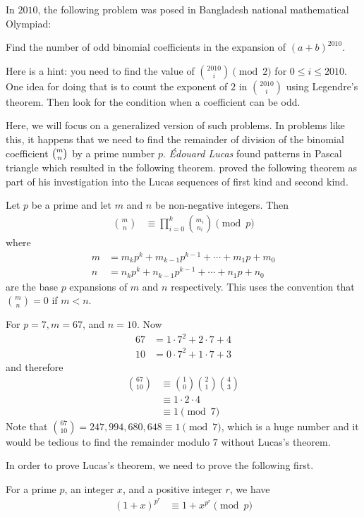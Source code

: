 In $2010$, the following problem was posed in Bangladesh national mathematical Olympiad:
\begin{problem}
	Find the number of odd binomial coefficients in the expansion of $(a+b)^{2010}$.
\end{problem}
Here is a hint: you need to find the value of $\binom{2010}{i}\pmod2$ for $0\leq i\leq2010$. One idea for doing that is to count the exponent of $2$ in $\binom{2010}{i}$ using Legendre's theorem. Then look for the condition when a coefficient can be odd.

Here, we will focus on a generalized version of such problems. In problems like this, it happens that we need to find the remainder of division of the binomial coefficient $\tbinom{m}{n}$ by a prime number $p$. \textit{\'{E}douard Lucas} found patterns in Pascal triangle which resulted in the following theorem. \textcite[Page $230$, $\S$ XXI]{lucas_1878_2} proved the following theorem as part of his investigation into the Lucas sequences of first kind and second kind.
\begin{theorem}
	Let $p$ be a prime and let $m$ and $n$ be non-negative integers. Then
		\begin{align*}
			\binom{m}{n}
				& \equiv\prod_{i=0}^k\binom{m_i}{n_i}\pmod p
		\end{align*}
	where
		\begin{align*}
			m & =m_kp^k+m_{k-1}p^{k-1}+\cdots +m_1p+m_0\\
			n & =n_kp^k+n_{k-1}p^{k-1}+\cdots +n_1p+n_0
		\end{align*}
	are the base $p$ expansions of $m$ and $n$ respectively. This uses the convention that $\binom{m}{n}=0$ if $m<n$.
\end{theorem}

\begin{example}
	For $p=7, m=67$, and $n=10$. Now
		\begin{align*}
			67
				& = 1 \cdot 7^2 + 2 \cdot 7 + 4\\
			10
				& = 0 \cdot 7^2 + 1 \cdot 7 + 3
		\end{align*}
	and therefore
		\begin{align*}
			\binom{67}{10}
				& \equiv\binom{1}{0}\binom{2}{1}\binom{4}{3}\\
				& \equiv 1 \cdot 2 \cdot 4\\
				& \equiv 1 \pmod 7
		\end{align*}
	Note that $\binom{67}{10} = 247,994,680,648 \equiv 1 \pmod 7$, which is a huge number and it would be tedious to find the remainder modulo $7$ without Lucas's theorem.
\end{example}
In order to prove Lucas's theorem, we need to prove the following first.
\begin{lemma}
	For a prime $p$, an integer $x$, and a positive integer $r$, we have
		\begin{align*}
			(1+x)^{p^r}
				& \equiv 1+x^{p^r}\pmod{p}
		\end{align*}
\end{lemma}

